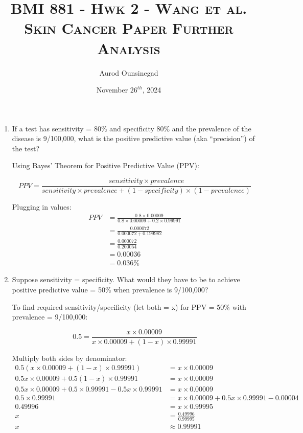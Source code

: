 \documentclass[a4paper]{article}
\title{\textsc{BMI 881 - Hwk 2 - Wang et al. Skin Cancer Paper Further Analysis}} %
\author{
Aurod Ounsinegad \\
}
\date{November $26^{th}$, 2024}
\newenvironment{soln}{
    \leavevmode\color{blue}\ignorespaces
}{}
\begin{document}
\maketitle 

\begin{enumerate}
    \item If a test has sensitivity = 80\% and specificity 80\% and the prevalence of the disease is 9/100,000, what is the positive predictive value (aka “precision”) of the test?\\
    \begin{soln}
        Using Bayes' Theorem for Positive Predictive Value (PPV):
        
        $$PPV = \frac{sensitivity \times prevalence}{sensitivity \times prevalence + (1-specificity) \times (1-prevalence)}$$
        
        Plugging in values:
        $$\begin{aligned}
            PPV &= \frac{0.8 \times 0.00009}{0.8 \times 0.00009 + 0.2 \times 0.99991} \\[2ex]
            &= \frac{0.000072}{0.000072 + 0.199982} \\[2ex]
            &= \frac{0.000072}{0.200054} \\[2ex]
            &= 0.00036 \\[2ex]
            &= 0.036\%
        \end{aligned}$$
    \end{soln}
    \item Suppose sensitivity = specificity. What would they have to be to achieve positive predictive value = 50\% when prevalence is 9/100,000?\\
    \begin{soln}
        To find required sensitivity/specificity (let both = x) for PPV = 50\% with prevalence = 9/100,000:
        
        $$0.5 = \frac{x \times 0.00009}{x \times 0.00009 + (1-x) \times 0.99991}$$
        
        Multiply both sides by denominator:
        $$\begin{aligned}
        0.5(x \times 0.00009 + (1-x) \times 0.99991) &= x \times 0.00009 \\[2ex]
        0.5x \times 0.00009 + 0.5(1-x) \times 0.99991 &= x \times 0.00009 \\[2ex]
        0.5x \times 0.00009 + 0.5 \times 0.99991 - 0.5x \times 0.99991 &= x \times 0.00009 \\[2ex]
        0.5 \times 0.99991 &= x \times 0.00009 + 0.5x \times 0.99991 - 0.00004 \\[2ex]
        0.49996 &= x \times 0.99995 \\[2ex]
        x &= \frac{0.49996}{0.99995} \\[2ex]
        x &\approx 0.99991
        \end{aligned}$$
        

\end{soln}
\end{enumerate}
\end{document}
